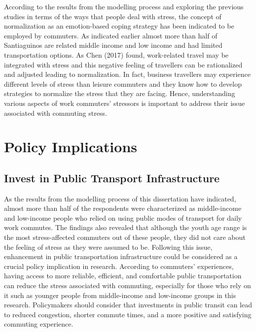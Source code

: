 \documentclass[
11pt, %
oneside, %
english, %
singlespacing, %
]{macthesis} %
\begin{document}
According to the results from the modelling process and exploring the previous studies in terms of the ways that people deal with stress, the concept of normalization as an emotion-based coping strategy has been indicated to be employed by commuters. As indicated earlier almost more than half of Santiaguinos are related middle income and low income and had limited transportation options. As Chen (2017) found, work-related travel may be integrated with stress and this negative feeling of travellers can be rationalized and adjusted leading to normalization. In fact, business travellers may experience different levels of stress than leisure commuters and they know how to develop strategies to normalize the stress that they are facing. Hence, understanding various aspects of work commuters' stressors is important to address their issue associated with commuting stress.

\hypertarget{policy-implications}{%
\section{Policy Implications}\label{policy-implications}}

\hypertarget{invest-in-public-transport-infrastructure}{%
\subsection{Invest in Public Transport Infrastructure}\label{invest-in-public-transport-infrastructure}}

As the results from the modelling process of this dissertation have indicated, almost more than half of the respondents were characterized as middle-income and low-income people who relied on using public modes of transport for daily work commutes. The findings also revealed that although the youth age range is the most stress-affected commuters out of these people, they did not care about the feeling of stress as they were assumed to be. Following this issue, enhancement in public transportation infrastructure could be considered as a crucial policy implication in research. According to commuters' experiences, having access to more reliable, efficient, and comfortable public transportation can reduce the stress associated with commuting, especially for those who rely on it such as younger people from middle-income and low-income groups in this research. Policymakers should consider that investments in public transit can lead to reduced congestion, shorter commute times, and a more positive and satisfying commuting experience.
\end{document}
